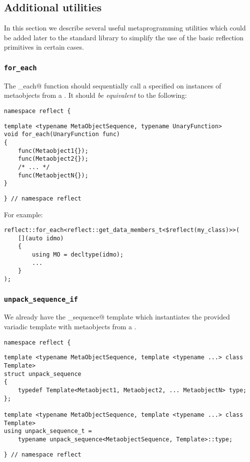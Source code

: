 \subsection{Additional utilities}
\label{fut-facade}

In this section we describe several useful metaprogramming utilities which
could be added later to the standard library to simplify the use of the basic
reflection primitives in certain cases.
 
\subsubsection{\texttt{for\_each}}
\label{fac-for-each}

The \verb@for_each@ function should sequentially call a specified
\verb@UnaryFunction@ on instances of metaobjects from
a . It should {\em be equivalent} to the following:

\begin{verbatim}
namespace reflect {
\end{verbatim}
\begin{verbatim}
template <typename MetaObjectSequence, typename UnaryFunction>
void for_each(UnaryFunction func)
{
	func(Metaobject1{});
	func(Metaobject2{});
	/* ... */
	func(MetaobjectN{});
}
\end{verbatim}
\begin{verbatim}
} // namespace reflect
\end{verbatim}

For example:

\begin{verbatim}
reflect::for_each<reflect::get_data_members_t<$reflect(my_class)>>(
	[](auto idmo)
	{
		using MO = decltype(idmo);
		...
	}
);
\end{verbatim}

\subsubsection{\texttt{unpack\_sequence\_if}}
\label{fac-unpack-sequence}

We already have the \verb@unpack_sequence@ template which instantiates
the provided variadic template with metaobjects from a .

\begin{verbatim}
namespace reflect {
\end{verbatim}
\begin{verbatim}
template <typename MetaObjectSequence, template <typename ...> class Template>
struct unpack_sequence
{
	typedef Template<Metaobject1, Metaobject2, ... MetaobjectN> type;
};

template <typename MetaObjectSequence, template <typename ...> class Template>
using unpack_sequence_t =
	typename unpack_sequence<MetaobjectSequence, Template>::type;
\end{verbatim}
\begin{verbatim}
} // namespace reflect
\end{verbatim}

